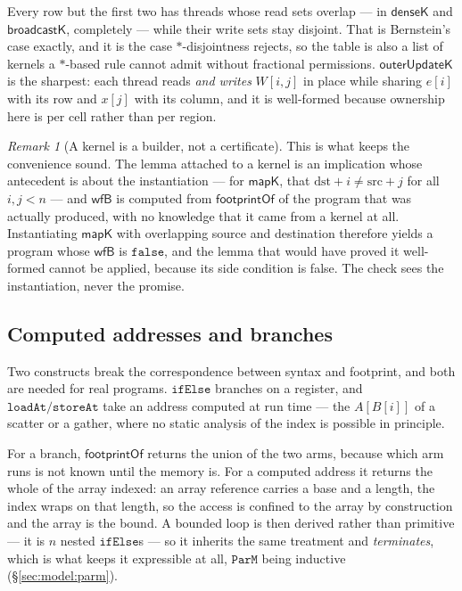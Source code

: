\documentclass[11pt,a4paper]{article}
\theoremstyle{definition}
\theoremstyle{plain}
\theoremstyle{remark}
\newtheorem{remark}[definition]{Remark}
\newcommand{\PM}{\texttt{ParM}}
\begin{document}
Every row but the first two has threads whose read sets overlap --- in $\mathsf{denseK}$ and
$\mathsf{broadcastK}$, completely --- while their write sets stay disjoint. That is
Bernstein's case exactly, and it is the case $\ast$-disjointness rejects, so the table is
also a list of kernels a $\ast$-based rule cannot admit without fractional permissions.
$\mathsf{outerUpdateK}$ is the sharpest: each thread reads \emph{and writes} $W[i,j]$ in
place while sharing $e[i]$ with its row and $x[j]$ with its column, and it is well-formed
because ownership here is per cell rather than per region.

\begin{remark}[A kernel is a builder, not a certificate]
This is what keeps the convenience sound. The lemma attached to a kernel is an implication
whose antecedent is about the instantiation --- for $\mathsf{mapK}$, that
$\mathrm{dst}+i \neq \mathrm{src}+j$ for all $i,j < n$ --- and $\mathsf{wfB}$ is computed from
$\mathsf{footprintOf}$ of the program that was actually produced, with no knowledge that it
came from a kernel at all. Instantiating $\mathsf{mapK}$ with overlapping source and
destination therefore yields a program whose $\mathsf{wfB}$ is $\mathtt{false}$, and the
lemma that would have proved it well-formed cannot be applied, because its side condition is
false. The check sees the instantiation, never the promise.
\end{remark}

\subsection{Computed addresses and branches}\label{sec:lang:approx}

Two constructs break the correspondence between syntax and footprint, and both are needed
for real programs. $\texttt{ifElse}$ branches on a register, and
$\texttt{loadAt}/\texttt{storeAt}$ take an address computed at run time --- the $A[B[i]]$ of
a scatter or a gather, where no static analysis of the index is possible in principle.

For a branch, $\mathsf{footprintOf}$ returns the union of the two arms, because which arm
runs is not known until the memory is. For a computed address it returns the whole of the
array indexed: an array reference carries a base and a length, the index wraps on that
length, so the access is confined to the array by construction and the array is the bound. A
bounded loop is then derived rather than primitive --- it is $n$ nested $\texttt{ifElse}$s ---
so it inherits the same treatment and \emph{terminates}, which is what keeps it expressible
at all, $\PM$ being inductive (\S\ref{sec:model:parm}).
\end{document}
